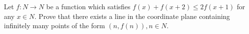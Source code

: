 Let $f : N \to  N$ be a function which satisfies $f(x)+ f(x+2) \le 2 f(x+1)$ for any $x \in N$.
Prove that there exists a line in the coordinate plane containing infinitely many points of the form $(n, f(n)), n \in N$.